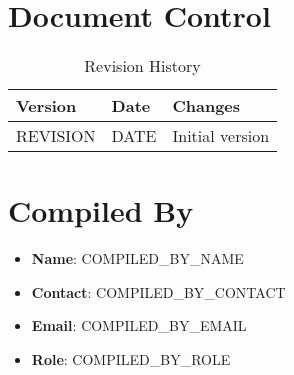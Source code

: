 \documentclass[12pt]{article}
\begin{document}
\section{Document Control}
\begin{table}[h]
    \centering
    \begin{tabular}{p{3cm}p{3cm}p{6cm}}
        \toprule
        \textbf{Version} & \textbf{Date} & \textbf{Changes} \\
        \midrule
        {{REVISION}} & {{DATE}} & Initial version \\
        \bottomrule
    \end{tabular}
    \caption{Revision History}
\end{table}

\section{Compiled By}
\begin{itemize}
    \item \textbf{Name}: {{COMPILED_BY_NAME}}
    \item \textbf{Contact}: {{COMPILED_BY_CONTACT}}
    \item \textbf{Email}: {{COMPILED_BY_EMAIL}}
    \item \textbf{Role}: {{COMPILED_BY_ROLE}}
\end{itemize}
\end{document}
